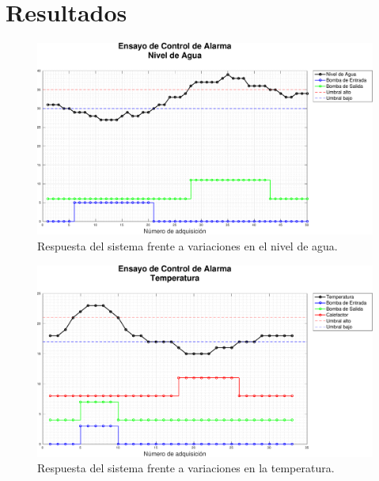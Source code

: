 
\section{Resultados}

\begin{figure}
\centering
    \includegraphics[width=\textwidth]{./Figures/Alarma1Nivel.pdf}
	\caption{Respuesta del sistema frente a variaciones en el nivel de agua.}
	\label{fig:alarma1Nivel}
\end{figure}

\begin{figure}
\centering
    \includegraphics[width=\textwidth]{./Figures/Alarma1Temp.pdf}
	\caption{Respuesta del sistema frente a variaciones en la temperatura.}
	\label{fig:alarma1Temp}
\end{figure}